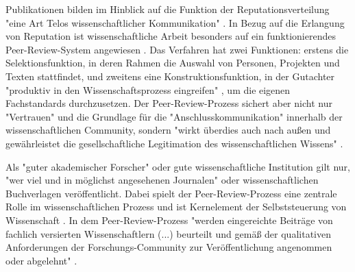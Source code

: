 Publikationen bilden im Hinblick auf die Funktion der Reputationsverteilung "eine Art Telos wissenschaftlicher Kommunikation" \cite{Hirschauer_2004}. In Bezug auf die Erlangung von Reputation ist wissenschaftliche Arbeit besonders auf ein funktionierendes Peer-Review-System angewiesen \cite{Luescher_2014}. Das Verfahren hat zwei Funktionen: erstens die Selektionsfunktion, in deren Rahmen die Auswahl von Personen, Projekten und Texten stattfindet, und zweitens eine Konstruktionsfunktion, in der Gutachter "produktiv in den Wissenschaftsprozess eingreifen" \cite{Neidhardt_2010}, um die eigenen Fachstandards durchzusetzen. Der Peer-Review-Prozess sichert aber nicht nur "Vertrauen" und die Grundlage für die "Anschlusskommunikation" innerhalb der wissenschaftlichen Community, sondern "wirkt überdies auch nach außen und gewährleistet die gesellschaftliche Legitimation des wissenschaftlichen Wissens" \cite[:141]{Pscheida_2010}.

Als "guter akademischer Forscher" oder gute wissenschaftliche Institution gilt nur, "wer viel und in möglichst angesehenen Journalen" \cite{Frey_2005} oder wissenschaftlichen Buchverlagen veröffentlicht. Dabei spielt der Peer-Review-Prozess eine zentrale Rolle im wissenschaftlichen Prozess \cite{Smith_1999b} und ist Kernelement der Selbststeuerung von Wissenschaft \cite[:5]{Neidhardt_2010}. In dem Peer-Review-Prozess "werden eingereichte Beiträge von fachlich versierten Wissenschaftlern (...) beurteilt und gemäß der qualitativen Anforderungen der Forschungs-Community zur Veröffentlichung angenommen oder abgelehnt" \cite{Hess_2006}.

